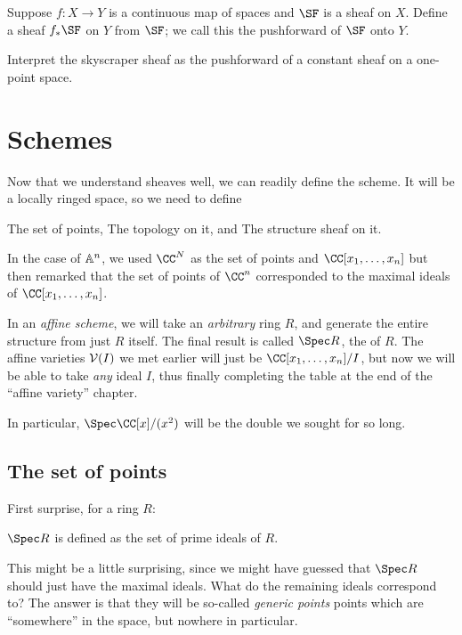\documentclass[11pt]{scrreprt}
\begin{document}
\begin{dproblem}
	Suppose $f : X \to Y$ is a continuous map of spaces
	and $\SF$ is a sheaf on $X$.
	Define a sheaf $f_\ast \SF$ on $Y$ from $\SF$;
	we call this the pushforward of $\SF$ onto $Y$.
\end{dproblem}

\begin{problem}
	Interpret the skyscraper sheaf as the pushforward
	of a constant sheaf on a one-point space.
\end{problem}

\chapter{Schemes}
Now that we understand sheaves well, we can readily define the scheme.
It will be a locally ringed space, so we need to define
\begin{itemize}
	\ii The set of points,
	\ii The topology on it, and
	\ii The structure sheaf on it.
\end{itemize}

In the case of $\mathbb A^n$, we used $\CC^N$ as the set of points
and $\CC[x_1, \dots, x_n]$ but then remarked that the set of points
of $\CC^n$ corresponded to the maximal ideals of $\CC[x_1, \dots, x_n]$.

In an \emph{affine scheme}, we will take an \emph{arbitrary} ring $R$,
and generate the entire structure from just $R$ itself.
The final result is called $\Spec R$, the  of $R$.
The affine varieties $\mathcal V(I)$ we met earlier will just be
$\CC[x_1, \dots, x_n] / I$, but now we will be able to take
\emph{any} ideal $I$, thus finally completing the table at the end
of the ``affine variety'' chapter.

In particular, $\Spec \CC[x] / (x^2)$ will be the double we sought for so long.

\section{The set of points}

First surprise, for a ring $R$:
\begin{moral}
	$\Spec R$ is defined as the set of prime ideals of $R$.
\end{moral}

This might be a little surprising, since we might have guessed
that $\Spec R$ should just have the maximal ideals.
What do the remaining ideals correspond to?
The answer is that they will be so-called \emph{generic points}
points which are ``somewhere'' in the space, but nowhere in particular.
\end{document}
